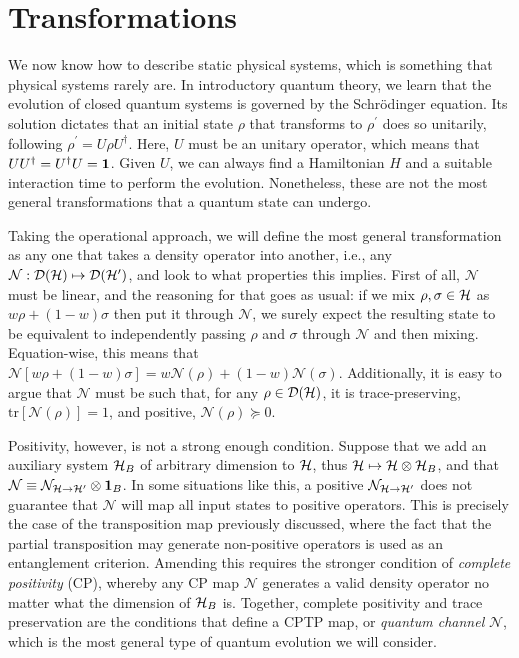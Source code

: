 	\section{Transformations}
	\label{sec:transformations}

		We now know how to describe static physical systems, which is something that physical systems rarely are. In introductory quantum theory, we learn that the evolution of closed quantum systems is governed by the Schrödinger equation. Its solution dictates that an initial state $\rho$ that transforms to $\rho^\prime$ does so unitarily, following $\rho^\prime = U \rho U^\dagger$. Here, $U$ must be an unitary operator, which means that $UU^\dagger = U^\dagger U = \mathbf{1}$. Given $U$, we can always find a Hamiltonian $H$ and a suitable interaction time to perform the evolution. Nonetheless, these are not the most general transformations that a quantum state can undergo.
		
		Taking the operational approach, we will define the most general transformation as any one that takes a density operator into another, i.e., any $\mathcal{N} : \mathcal{D}(\mathcal{H}) \mapsto \mathcal{D}(\mathcal{H}^\prime)$, and look to what properties this implies. First of all, $\mathcal{N}$ must be linear, and the reasoning for that goes as usual: if we mix $\rho, \sigma \in \mathcal{H}$ as $w \rho + (1-w) \sigma$ then put it through $\mathcal{N}$, we surely expect the resulting state to be equivalent to independently passing $\rho$ and $\sigma$ through $\mathcal{N}$ and then mixing. Equation-wise, this means that $\mathcal{N} \left[ w \rho + (1-w) \sigma \right] = w \mathcal{N}(\rho) + (1-w) \mathcal{N}(\sigma)$. Additionally, it is easy to argue that $\mathcal{N}$ must be such that, for any $\rho \in \mathcal{D}(\mathcal{H})$, it is trace-preserving, $\text{tr}\left[ \mathcal{N}(\rho) \right] = 1$, and positive, $\mathcal{N}(\rho) \succeq 0$.
		
		Positivity, however, is not a strong enough condition. Suppose that we add an auxiliary system $\mathcal{H}_B$ of arbitrary dimension to $\mathcal{H}$, thus $\mathcal{H} \mapsto \mathcal{H} \otimes \mathcal{H}_B$, and that $\mathcal{N} \equiv \mathcal{N}_{\mathcal{H} \rightarrow \mathcal{H}^\prime} \otimes \mathbf{1}_B$. In some situations like this, a positive $\mathcal{N}_{\mathcal{H} \rightarrow \mathcal{H}^\prime}$ does not guarantee that $\mathcal{N}$ will map all input states to positive operators. This is precisely the case of the transposition map previously discussed, where the fact that the partial transposition may generate non-positive operators is used as an entanglement criterion. Amending this requires the stronger condition of \emph{complete positivity} (CP), whereby any CP map $\mathcal{N}$ generates a valid density operator no matter what the dimension of $\mathcal{H}_B$ is. Together, complete positivity and trace preservation are the conditions that define a CPTP map, or \emph{quantum channel} $\mathcal{N}$, which is the most general type of quantum evolution we will consider.
		
